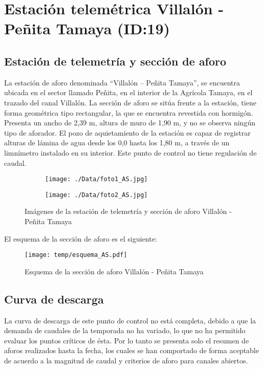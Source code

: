 \documentclass[]{article}
\begin{document}
\clearpage
\section{Estación telemétrica Villalón - Peñita Tamaya (ID:19)}

\subsection{Estación de telemetría y sección de aforo}

La estación de aforo denominada “Villalón – Peñita Tamaya”, se encuentra ubicada en el sector llamado Peñita, en el interior de la Agrícola Tamaya, en el trazado del canal Villalón. La sección de aforo se sitúa frente a la estación, tiene forma geométrica tipo rectangular, la que se encuentra revestida con hormigón. Presenta un ancho de 2,39 m, altura de muro de 1,90 m, y no se observa ningún tipo de aforador. El pozo de aquietamiento de la estación es capaz de registrar alturas de lámina de agua desde los 0,0 hasta los 1,80 m, a través de un limnímetro instalado en su interior. Este punto de control no tiene regulación de caudal.

\begin{figure}[H]
  \centering
\begin{subfigure}{.49\textwidth}
  \texttt{[image: ./Data/foto1\_AS.jpg]}
\end{subfigure}
\hfill
\begin{subfigure}{.49\textwidth}
  \texttt{[image: ./Data/foto2\_AS.jpg]}
\end{subfigure}
\caption{Imágenes de la estación de telemetría y sección de aforo Villalón - Peñita Tamaya}
\label{fig:fotos_19}
\end{figure}

El esquema de la sección de aforo es el siguiente:

\begin{figure}[H]
  \centering
  \texttt{[image: temp/esquema\_AS.pdf]}
\caption{Esquema de la sección de aforo Villalón - Peñita Tamaya}
\label{fig:Esquema_AS}
\end{figure}

\subsection{Curva de descarga}\label{curva-de-descarga-18}

La curva de descarga de este punto de control no está completa, debido a que la demanda de caudales de la temporada no ha variado, lo que no ha permitido evaluar los puntos críticos de ésta. Por lo tanto se presenta solo el resumen de aforos realizados hasta la fecha, los cuales se han comportado de forma aceptable de acuerdo a la magnitud de caudal y criterios de aforo para canales abiertos.
\end{document}
